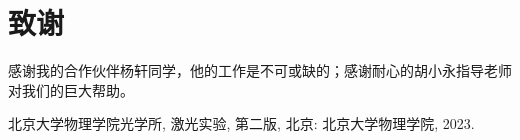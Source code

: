 \documentclass[aps,pre,12pt,preprint,%
	onecolumn,showpacs,showkeys,nofootinbib]{revtex4-2}
\begin{document}
\section{致谢}
	感谢我的合作伙伴杨轩同学，他的工作是不可或缺的；感谢耐心的胡小永指导老师对我们的巨大帮助。
\begin{thebibliography}{99}
	北京大学物理学院光学所, 激光实验, 第二版, 北京: 北京大学物理学院, 2023.
\end{thebibliography}
\clearpage
\end{document}
